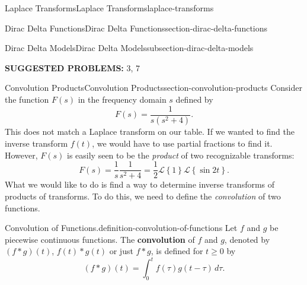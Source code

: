 \documentclass[oneside,10pt,]{book}
\newcommand{\terminology}[1]{\textbf{#1}}
\numberwithin{equation}{section}
\newcommand{\Int}[2]{\int_{#1}^{#2}}
\newcommand{\Laplace}[1]{\mathcal{L}\left\{#1\right\}}
\begin{document}
\begin{chapterptx}{Laplace Transforms}{}{Laplace Transforms}{}{}{laplace-transforms}
\begin{sectionptx}{Dirac Delta Functions}{}{Dirac Delta Functions}{}{}{section-dirac-delta-functions}
\begin{subsectionptx}{Dirac Delta Models}{}{Dirac Delta Models}{}{}{subsection-dirac-delta-models}
\begin{figure}
\centering
{
}
\end{figure}
\end{subsectionptx}
\terminology{SUGGESTED PROBLEMS:} 3, 7\end{sectionptx}
%
%
\typeout{************************************************}
\typeout{************************************************}
%
\begin{sectionptx}{Convolution Products}{}{Convolution Products}{}{}{section-convolution-products}
\hypertarget{p-553}{}%
Consider the function \(F(s)\) in the frequency domain \(s\) defined by%
\begin{equation*}
F(s) = \frac{1}{s(s^{2}+4)}.
\end{equation*}
This does not match a Laplace transform on our table. If we wanted to find the inverse transform \(f(t)\), we would have to use partial fractions to find it. However, \(F(s)\) is easily seen to be the \emph{product} of two recognizable transforms:%
\begin{equation*}
F(s) = \frac{1}{s} \frac{1}{s^{2}+4} = \frac{1}{2}\Laplace{1}\Laplace{\sin2t}.
\end{equation*}
What we would like to do is find a way to determine inverse transforms of products of transforms. To do this, we need to define the \emph{convolution} of two functions.%
\begin{definition}{Convolution of Functions.}{definition-convolution-of-functions}%
\hypertarget{p-554}{}%
Let \(f\) and \(g\) be piecewise continuous functions. The \terminology{convolution} of \(f\) and \(g\), denoted by \((f\ast g)(t)\), \(f(t)\ast g(t)\) or just \(f\ast g\), is defined for \(t\geq0\) by%
\begin{equation*}
(f\ast g)(t) = \Int{0}{t} f(\tau)g(t-\tau)\,d\tau.
\end{equation*}

\end{definition}
\end{sectionptx}
\end{chapterptx}
\end{document}
